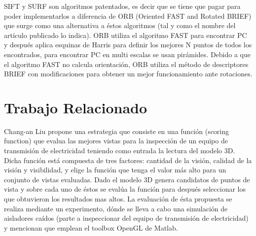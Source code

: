 \documentclass[]{report}
\begin{document}
SIFT y SURF son algoritmos patentados, es decir que se tiene que pagar para poder implementarlos a diferencia de ORB (Oriented FAST and Rotated BRIEF) que surge como una alternativa a éstos algoritmos (tal y como el nombre del artículo publicado lo indica).  ORB utiliza el algoritmo FAST para encontrar PC y después aplica esquinas de Harris para definir los mejores N puntos de todos los encontrados, para encontrar PC en multi escalas se usan pirámides. Debido a que el algoritmo FAST no calcula orientación, ORB utiliza el método de descriptores BRIEF con modificaciones para obtener un mejor funcionamiento ante rotaciones.


\chapter{Trabajo Relacionado}
 Chang-an Liu \cite{liu2014flying} propone una estrategia que consiste en una función (scoring function) que evalua las mejores vistas para la inspección de un equipo de transmisión de electricidad teniendo como entrada la lectura del modelo 3D. Dicha función está compuesta de tres factores: cantidad de la visión, calidad de la visión y visibilidad, y elige la función que tenga el valor más alto para un conjunto de vistas evaluadas.  Dado el modelo 3D genera candidatos de puntos de vista y sobre cada uno de éstos se evalúa la función para después seleccionar los que obtuvieron los resultados mas altos. La evaluación de ésta propuesta se realiza mediante un experimento, dónde se lleva a cabo una simulación de aisladores caídos (parte a inspeccionar del equipo de transmisión de electricidad) y mencionan que emplean el toolbox OpenGL de Matlab. 
\end{document}

